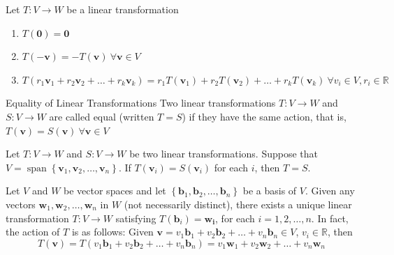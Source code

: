 \documentclass[12pt]{article}
\begin{document}
\begin{theorem}{}{}
    Let $ T : V \to W $ be a linear transformation
    \begin{enumerate}[label=(\roman*)]
        \item $ T \left( \mathbf{0} \right) = \mathbf{0} $
        \item $ T \left( -\mathbf{v} \right) = - T \left( \mathbf{v} \right) \ \forall \mathbf{v} \in V $
        \item $ T \left( r_1 \mathbf{v}_1 + r_2 \mathbf{v}_2 + \dots + r_k \mathbf{v}_k \right) = r_1 T ( \mathbf{v}_1 ) + r_2 T ( \mathbf{v}_2 ) + \dots + r_k T ( \mathbf{v}_k ) \ \forall v_i \in V, r_i \in \mathbb{R}$
    \end{enumerate}
\end{theorem}

\begin{definition}{Equality of Linear Transformations}{}
    Two linear transformations $ T : V \to W $ and $ S : V \to W $ are called equal (written $ T = S $) if they have the same action, that is, $ T \left( \mathbf{v} \right) = S \left( \mathbf{v} \right) \ \forall \mathbf{v} \in V $
\end{definition}

\begin{theorem}{}{}
    Let $ T : V \to W $ and $ S : V \to W $ be two linear transformations. Suppose that $ V = \operatorname{span} \left\{ \mathbf{v}_1, \mathbf{v}_2, \dots, \mathbf{v}_n \right\} $. If $ T \left( \mathbf{v}_i \right) = S \left( \mathbf{v}_i \right) $ for each $ i $, then $ T = S $.
\end{theorem}

\begin{theorem}{}{}
    Let $ V $ and $ W $ be vector spaces and let $ \left\{ \mathbf{b}_1, \mathbf{b}_2, \dots, \mathbf{b}_n \right\} $ be a basis of $ V $. Given any vectors $ \mathbf{w}_1, \mathbf{w}_2, \dots, \mathbf{w}_n $ in $ W $ (not necessarily distinct), there exists a unique linear transformation $ T : V \to W $ satisfying $ T \left( \mathbf{b}_i \right) = \mathbf{w_i} $, for each $ i = 1, 2, \dots, n $. In fact, the action of $ T $ is as follows:
    \medskip
    \newline
    Given $ \mathbf{v} = v_1 \mathbf{b}_1 + v_2 \mathbf{b}_2 + \dots + v_n \mathbf{b}_n \in V $, $ v_i \in \mathbb{R} $, then
    \[ T \left( \mathbf{v} \right) = T \left( v_1 \mathbf{b}_1 + v_2 \mathbf{b}_2 + \dots + v_n \mathbf{b}_n \right) = v_1 \mathbf{w}_1 + v_2 \mathbf{w}_2 + \dots + v_n \mathbf{w}_n \]
\end{theorem}
\end{document}
